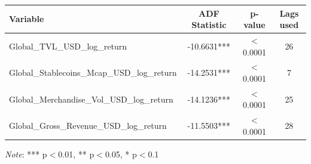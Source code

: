\begin{tabular}{lccc}
  \toprule
  \textbf{Variable} & \textbf{ADF Statistic} & \textbf{p-value} & \textbf{Lags used} \\ 
  \midrule
  Global\_TVL\_USD\_log\_return & -10.6631*** & $<$0.0001 & 26 \\ 
  Global\_Stablecoins\_Mcap\_USD\_log\_return & -14.2531*** & $<$0.0001 & 7 \\ 
  Global\_Merchandise\_Vol\_USD\_log\_return & -14.1236*** & $<$0.0001 & 25 \\ 
  Global\_Gross\_Revenue\_USD\_log\_return & -11.5503*** & $<$0.0001 & 28 \\ 
  \bottomrule
\end{tabular}
\par\vspace{4pt}
\begin{minipage}{\linewidth}
  \footnotesize \textit{Note}: *** p$<$0.01, ** p$<$0.05, * p$<$0.1
\end{minipage}
